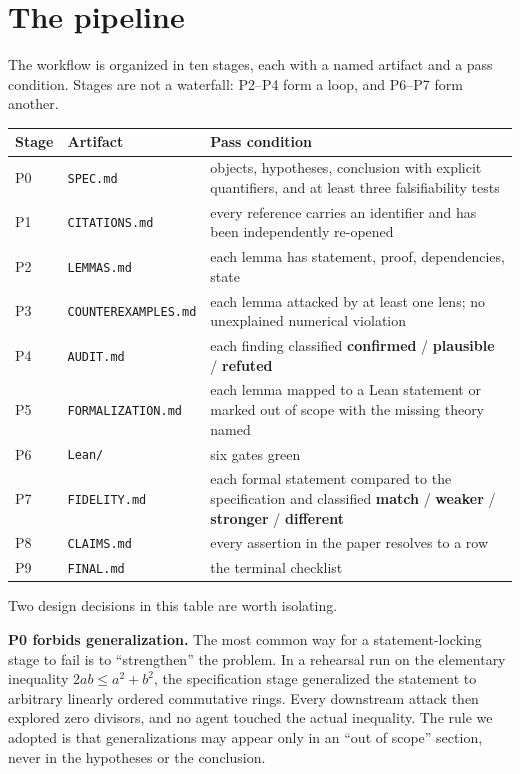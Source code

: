 \documentclass[11pt]{article}
\newcommand{\Lean}{Lean}
\newcommand{\code}[1]{\texttt{#1}}
\begin{document}
\section{The pipeline}

The workflow is organized in ten stages, each with a named artifact and a pass
condition. Stages are not a waterfall: P2--P4 form a loop, and P6--P7 form
another.

\begin{center}
\begin{tabular}{@{}p{}p{}p{}@{}}
\toprule
Stage & Artifact & Pass condition \\
\midrule
P0 & \code{SPEC.md} & objects, hypotheses, conclusion with explicit
  quantifiers, and at least three falsifiability tests \\
P1 & \code{CITATIONS.md} & every reference carries an identifier and has been
  independently re-opened \\
P2 & \code{LEMMAS.md} & each lemma has statement, proof, dependencies, state \\
P3 & \code{COUNTEREXAMPLES.md} & each lemma attacked by at least one lens; no
  unexplained numerical violation \\
P4 & \code{AUDIT.md} & each finding classified \textbf{confirmed} /
  \textbf{plausible} / \textbf{refuted} \\
P5 & \code{FORMALIZATION.md} & each lemma mapped to a \Lean{} statement or
  marked out of scope with the missing theory named \\
P6 & \code{Lean/} & six gates green \\
P7 & \code{FIDELITY.md} & each formal statement compared to the specification
  and classified \textbf{match} / \textbf{weaker} / \textbf{stronger} /
  \textbf{different} \\
P8 & \code{CLAIMS.md} & every assertion in the paper resolves to a row \\
P9 & \code{FINAL.md} & the terminal checklist \\
\bottomrule
\end{tabular}
\end{center}

Two design decisions in this table are worth isolating.

\textbf{P0 forbids generalization.} The most common way for a statement-locking
stage to fail is to ``strengthen'' the problem. In a rehearsal run on the
elementary inequality $2ab \le a^2+b^2$, the specification stage generalized
the statement to arbitrary linearly ordered commutative rings. Every
downstream attack then explored zero divisors, and no agent touched the actual
inequality. The rule we adopted is that generalizations may appear only in an
``out of scope'' section, never in the hypotheses or the conclusion.
\end{document}
